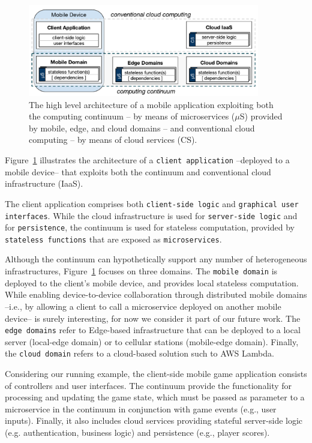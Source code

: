 \begin{figure}[tbp]
	\includegraphics[width=0.9\textwidth]{figs/Continuum-arch}
	\caption{The high level architecture of a mobile application exploiting both the computing continuum -- by means of microservices ($\mu$S) provided by mobile, edge, and cloud domains -- and conventional cloud computing -- by means of cloud services (CS).}
	\label{fig:Continuum-arch}
\end{figure}

Figure~\ref{fig:Continuum-arch} illustrates the architecture of a \texttt{client application} --deployed to a mobile device-- that exploits both the continuum and conventional cloud infrastructure (IaaS). 

The client application comprises both \texttt{client-side logic} and \texttt{graphical user interfaces}. While the cloud infrastructure is used for \texttt{server-side logic} and for \texttt{persistence}, the continuum is used for stateless computation, provided by \texttt{stateless functions} that are exposed as \texttt{microservices}.

Although the continuum can hypothetically support any number of heterogeneous infrastructures, Figure~\ref{fig:Continuum-arch} focuses on three domains. The \texttt{mobile domain} is deployed to the client's mobile device, and provides local stateless computation. While enabling device-to-device collaboration through distributed mobile domains --i.e., by allowing a client to call a microservice deployed on another mobile device-- is surely interesting, for now we consider it part of our future work. The \texttt{edge domains} refer to Edge-based infrastructure that can be deployed to a local server (local-edge domain) or to cellular stations (mobile-edge domain). Finally, the \texttt{cloud domain} refers to a cloud-based solution such to AWS Lambda.

Considering our running example, the client-side mobile game application consists of controllers and user interfaces. The continuum provide the functionality for processing and updating the game state, which must be passed as parameter to a microservice in the continuum in conjunction with game events (e.g., user inputs). Finally, it also includes cloud services providing stateful server-side logic (e.g. authentication, business logic) and persistence (e.g., player scores). 

